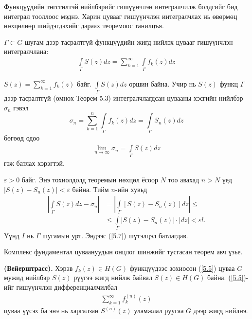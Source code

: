 Функцүүдийн төгсгөлтэй нийлбэрийг гишүүнчлэн интегралчилж болдгийг бид интеграл тооллоос мэднэ. Харин цувааг гишүүнчлэн интегралчлах нь өвөрмөц нөхцөлөөр шийдэгдэхийг дараах теоремоос танилцъя.
\begin{thm}
$\Gamma \subset G$ шугам дээр тасралтгүй функцүүдийн жигд нийлэх цувааг гишүүнчлэн интегралчлана: 
\begin{eqnarray}
   \int\limits_{\Gamma} S(z)dz=\sum\limits _{k=1}^\infty \int\limits_{\Gamma} f_k(z)dz
\end{eqnarray}
\end{thm}
\begin{prf}
$S(z)=\sum\limits_{k=1}^\infty f_k(z)$ байг. $\displaystyle\int\limits_{\Gamma} S(z)dz$ оршин байна. Учир нь $S(z)$ функц $\Gamma$ дээр тасралтгүй (өмнөх Теорем 5.3) интегралчлагдсан цувааны хэсгийн нийлбэр $\sigma_n$ гэвэл
$$\sigma_n= \sum\limits_{k=1}^n\int\limits_{\Gamma} f_k(z)dz=\int\limits_\Gamma S_n(z)dz$$
бөгөөд одоо
\begin{eqnarray} \label{5.7}
   \lim\limits_{n\rightarrow \infty} \sigma_n =\int\limits_\Gamma S(z)dz
\end{eqnarray}
гэж батлах хэрэгтэй.

$\varepsilon > 0$ байг. Энэ тохиолдолд теоремын нөхцөл ёсоор $N$ тоо авахад $n>N$ үед $|S(z)-S_n(z)|<\varepsilon$ байна. Тийм $n$-ийн хувьд 
\begin{align*}
    \left|\int\limits_{\Gamma} S(z)dz-\sigma _n \right|&= \left|\int\limits_{\Gamma} [S(z)-S_n(z)]dz\right|\leq \\
    &\leq \int\limits_{\Gamma}|S(z)-S_n(z)|\cdot |dz|<\varepsilon l.
\end{align*}
Үүнд $I$ нь $\Gamma$ шугамын урт. Эндээс (\ref{5.7}) шүтэлцэл батлагдав.
 \end{prf}
Комплекс фундаментал цуваануудын онцлог шинжийг тусгасан теорем авч үзье.
\begin{thm}
\textbf{(Вейерштрасс).}  Хэрэв $f_k(z)\in H(G)$ функцүүдээс зохиосон (\ref{5.5}) цуваа $G$ мужид нийлбэр $S(z)$ рүүгээ жигд нийлж байвал $S(z)\in H(G)$ байна. (\ref{5.5})-ийг гишүүнчлэн дифференциалчилбал 
\begin{eqnarray} \label{5.8}
   \sum\limits_{k=1}^\infty f_k^{(n)} (z)
\end{eqnarray}
цуваа үүсэх ба энэ нь харгалзан $S^{(n)}(z)$ уламжлал руугаа $G$ дээр жигд нийлнэ.
\end{thm}
